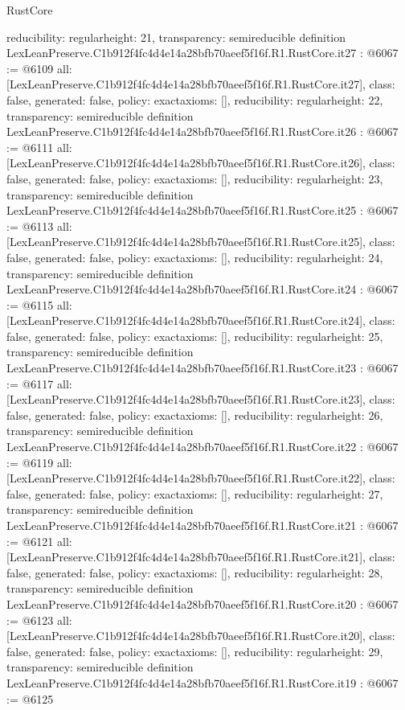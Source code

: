 \begin{lexlean}{RustCore}
\begin{coremodule}
{  reducibility: regular{height: 21},
  transparency: semireducible
}
definition LexLeanPreserve.C1b912f4fc4d4e14a28bfb70aeef5f16f.R1.RustCore.it27 : @6067 := @6109 {
  all: [LexLeanPreserve.C1b912f4fc4d4e14a28bfb70aeef5f16f.R1.RustCore.it27],
  class: false,
  generated: false,
  policy: exact{axioms: []},
  reducibility: regular{height: 22},
  transparency: semireducible
}
definition LexLeanPreserve.C1b912f4fc4d4e14a28bfb70aeef5f16f.R1.RustCore.it26 : @6067 := @6111 {
  all: [LexLeanPreserve.C1b912f4fc4d4e14a28bfb70aeef5f16f.R1.RustCore.it26],
  class: false,
  generated: false,
  policy: exact{axioms: []},
  reducibility: regular{height: 23},
  transparency: semireducible
}
definition LexLeanPreserve.C1b912f4fc4d4e14a28bfb70aeef5f16f.R1.RustCore.it25 : @6067 := @6113 {
  all: [LexLeanPreserve.C1b912f4fc4d4e14a28bfb70aeef5f16f.R1.RustCore.it25],
  class: false,
  generated: false,
  policy: exact{axioms: []},
  reducibility: regular{height: 24},
  transparency: semireducible
}
definition LexLeanPreserve.C1b912f4fc4d4e14a28bfb70aeef5f16f.R1.RustCore.it24 : @6067 := @6115 {
  all: [LexLeanPreserve.C1b912f4fc4d4e14a28bfb70aeef5f16f.R1.RustCore.it24],
  class: false,
  generated: false,
  policy: exact{axioms: []},
  reducibility: regular{height: 25},
  transparency: semireducible
}
definition LexLeanPreserve.C1b912f4fc4d4e14a28bfb70aeef5f16f.R1.RustCore.it23 : @6067 := @6117 {
  all: [LexLeanPreserve.C1b912f4fc4d4e14a28bfb70aeef5f16f.R1.RustCore.it23],
  class: false,
  generated: false,
  policy: exact{axioms: []},
  reducibility: regular{height: 26},
  transparency: semireducible
}
definition LexLeanPreserve.C1b912f4fc4d4e14a28bfb70aeef5f16f.R1.RustCore.it22 : @6067 := @6119 {
  all: [LexLeanPreserve.C1b912f4fc4d4e14a28bfb70aeef5f16f.R1.RustCore.it22],
  class: false,
  generated: false,
  policy: exact{axioms: []},
  reducibility: regular{height: 27},
  transparency: semireducible
}
definition LexLeanPreserve.C1b912f4fc4d4e14a28bfb70aeef5f16f.R1.RustCore.it21 : @6067 := @6121 {
  all: [LexLeanPreserve.C1b912f4fc4d4e14a28bfb70aeef5f16f.R1.RustCore.it21],
  class: false,
  generated: false,
  policy: exact{axioms: []},
  reducibility: regular{height: 28},
  transparency: semireducible
}
definition LexLeanPreserve.C1b912f4fc4d4e14a28bfb70aeef5f16f.R1.RustCore.it20 : @6067 := @6123 {
  all: [LexLeanPreserve.C1b912f4fc4d4e14a28bfb70aeef5f16f.R1.RustCore.it20],
  class: false,
  generated: false,
  policy: exact{axioms: []},
  reducibility: regular{height: 29},
  transparency: semireducible
}
definition LexLeanPreserve.C1b912f4fc4d4e14a28bfb70aeef5f16f.R1.RustCore.it19 : @6067 := @6125 {
}
\end{coremodule}
\end{lexlean}
